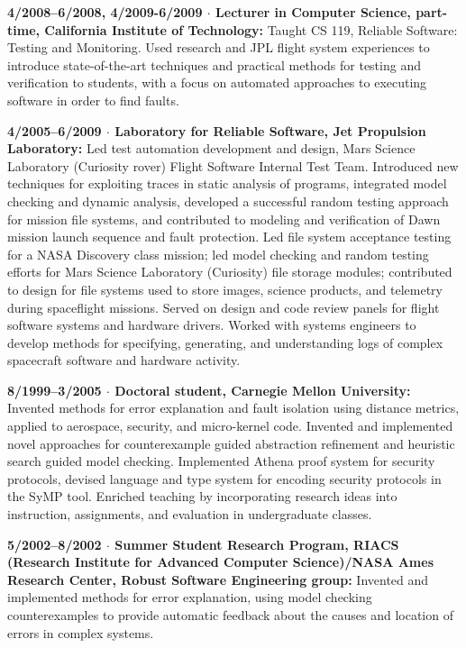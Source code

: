 \documentclass[ComputerScience]{vita}
\begin{document}
\begin{vita}
\begin{Experience}
  \item {\bf 4/2008--6/2008, 4/2009-6/2009 $\cdot$ Lecturer in
    Computer Science, part-time, California Institute of Technology:}
    Taught CS 119, Reliable Software: Testing and Monitoring.  Used
    research and JPL flight system experiences to introduce
    state-of-the-art techniques and practical methods for testing and
    verification to students, with a focus on automated approaches to
    executing software in order to find faults.

  \item {\bf 4/2005--6/2009 $\cdot$ Laboratory for Reliable Software,
    Jet Propulsion Laboratory:} Led test automation development and
    design, Mars Science Laboratory (Curiosity rover) Flight Software
    Internal Test Team.  Introduced new techniques for exploiting
    traces in static analysis of programs, integrated model checking
    and dynamic analysis, developed a successful random testing
    approach for mission file systems, and contributed to modeling and
    verification of Dawn mission launch sequence and fault protection.
    Led file system acceptance testing for a NASA Discovery class
    mission; led model checking and random testing efforts for Mars
    Science Laboratory (Curiosity) file storage modules; contributed
    to design for file systems used to store images, science products,
    and telemetry during spaceflight missions.  Served on design and
    code review panels for flight software systems and hardware
    drivers.  Worked with systems engineers to develop methods for
    specifying, generating, and understanding logs of complex
    spacecraft software and hardware activity.

  \item {\bf 8/1999--3/2005 $\cdot$ Doctoral student, Carnegie Mellon
    University:} Invented methods for error explanation and fault
    isolation using distance metrics, applied to aerospace, security, and
    micro-kernel code.  Invented and implemented novel approaches for
    counterexample guided abstraction refinement and heuristic search
    guided model checking.  Implemented Athena proof system for
    security protocols, devised language and type system for encoding
    security protocols in the SyMP tool.  Enriched teaching by
    incorporating research ideas into instruction, assignments, and
    evaluation in undergraduate classes.

  \item {\bf 5/2002--8/2002 $\cdot$  Summer Student Research Program, RIACS (Research Institute for Advanced Computer Science)/NASA Ames Research Center, Robust Software Engineering group:}  Invented and implemented methods for error explanation, using model checking counterexamples to provide automatic feedback about the causes and location of errors in complex systems.


\end{Experience}
\end{vita}
\end{document}
